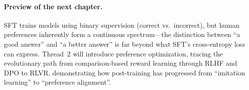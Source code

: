 \paragraph{Preview of the next chapter.}
SFT trains models using binary supervision (correct vs.\ incorrect),
but human preferences inherently form a continuous spectrum---the
distinction between ``a good answer'' and ``a better answer'' is far beyond what SFT's cross-entropy loss can express.
Thread~2 will introduce preference optimization,
tracing the evolutionary path from comparison-based reward learning through RLHF and DPO to RLVR,
demonstrating how post-training has progressed from ``imitation learning'' to ``preference alignment''.
